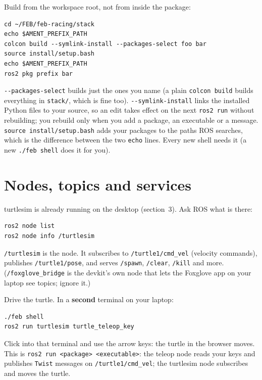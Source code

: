 \documentclass[11pt,a4paper]{article}
\begin{document}
Build from the workspace root, not from inside the package:

\begin{lstlisting}
cd ~/FEB/feb-racing/stack
echo $AMENT_PREFIX_PATH
colcon build --symlink-install --packages-select foo bar
source install/setup.bash
echo $AMENT_PREFIX_PATH
ros2 pkg prefix bar
\end{lstlisting}

\texttt{-{}-packages-select} builds just the ones you name (a plain \texttt{colcon build} builds
everything in \texttt{stack/}, which is fine too). \texttt{-{}-symlink-install} links the
installed Python files to your source, so an edit takes effect on the next \texttt{ros2 run}
without rebuilding; you rebuild only when you add a package, an executable or a message.
\texttt{source install/setup.bash} adds your packages to the paths ROS searches, which is the
difference between the two \texttt{echo} lines. Every new shell needs it (a new \texttt{./feb
shell} does it for you).


\section{Nodes, topics and services}

turtlesim is already running on the desktop (section~3). Ask ROS what is there:

\begin{lstlisting}
ros2 node list
ros2 node info /turtlesim
\end{lstlisting}

\texttt{/turtlesim} is the node. It subscribes to \texttt{/turtle1/cmd\_vel} (velocity
commands), publishes \texttt{/turtle1/pose}, and serves \texttt{/spawn}, \texttt{/clear},
\texttt{/kill} and more. (\texttt{/foxglove\_bridge} is the devkit's own node that lets the
Foxglove app on your laptop see topics; ignore it.)

Drive the turtle. In a \textbf{second} terminal on your laptop:

\begin{lstlisting}
./feb shell
ros2 run turtlesim turtle_teleop_key
\end{lstlisting}

Click into that terminal and use the arrow keys: the turtle in the browser moves. This is
\texttt{ros2 run <package> <executable>}: the teleop node reads your keys and publishes
\texttt{Twist} messages on \texttt{/turtle1/cmd\_vel}; the turtlesim node subscribes and moves
the turtle.
\end{document}
